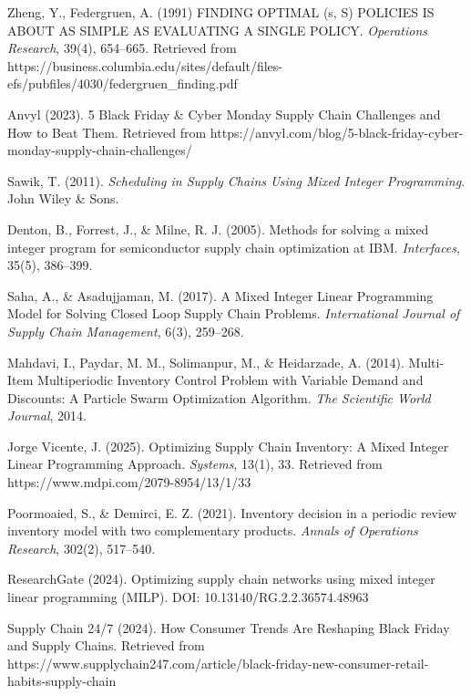 \documentclass[a4paper,12pt]{article}
\begin{document}
\begin{thebibliography}{99}

Zheng, Y., Federgruen, A. (1991)
FINDING OPTIMAL (s, S) POLICIES IS ABOUT AS SIMPLE AS EVALUATING A SINGLE POLICY. \textit{Operations Research}, 39(4),  654--665.
Retrieved from https://business.columbia.edu/sites/default/files-efs/pubfiles/4030/federgruen\_finding.pdf

Anvyl (2023).
5 Black Friday \& Cyber Monday Supply Chain Challenges and How to Beat Them.
Retrieved from https://anvyl.com/blog/5-black-friday-cyber-monday-supply-chain-challenges/

Sawik, T. (2011). \textit{Scheduling in Supply Chains Using Mixed Integer Programming}.
John Wiley \& Sons.

Denton, B., Forrest, J., \& Milne, R. J. (2005).
Methods for solving a mixed integer program for semiconductor supply chain optimization at IBM. \textit{Interfaces}, 35(5), 386--399.

Saha, A., \& Asadujjaman, M. (2017).
A Mixed Integer Linear Programming Model for Solving Closed Loop Supply Chain Problems. \textit{International Journal of Supply Chain Management}, 6(3), 259--268.

Mahdavi, I., Paydar, M. M., Solimanpur, M., \& Heidarzade, A. (2014).
Multi-Item Multiperiodic Inventory Control Problem with Variable Demand and Discounts: A Particle Swarm Optimization Algorithm. \textit{The Scientific World Journal}, 2014.

Jorge Vicente, J. (2025).
Optimizing Supply Chain Inventory: A Mixed Integer Linear Programming Approach. \textit{Systems}, 13(1), 33.
Retrieved from https://www.mdpi.com/2079-8954/13/1/33

Poormoaied, S., \& Demirci, E. Z. (2021).
Inventory decision in a periodic review inventory model with two complementary products. \textit{Annals of Operations Research}, 302(2), 517--540.

ResearchGate (2024).
Optimizing supply chain networks using mixed integer linear programming (MILP).
DOI: 10.13140/RG.2.2.36574.48963

Supply Chain 24/7 (2024).
How Consumer Trends Are Reshaping Black Friday and Supply Chains.
Retrieved from https://www.supplychain247.com/article/black-friday-new-consumer-retail-habits-supply-chain


\end{thebibliography}
\end{document}
